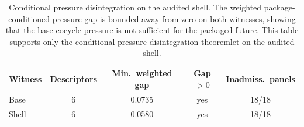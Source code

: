 \begin{table}[t]
\caption{Conditional pressure disintegration on the audited shell.
The weighted package-conditioned pressure gap is bounded away from zero
on both witnesses, showing that the base cocycle pressure is not sufficient
for the packaged future.
This table supports only the conditional pressure disintegration
theoremlet on the audited shell.}
\label{tbl:conditional-disintegration}
\centering
\small
\begin{tabular}{@{}l c c c c@{}}
\toprule
Witness & Descriptors & Min.\ weighted gap & Gap $>0$ & Inadmiss.\ panels \\
\midrule
Base  & 6 & 0.0735 & yes & 18/18 \\
Shell & 6 & 0.0580 & yes & 18/18 \\
\bottomrule
\end{tabular}
\end{table}
